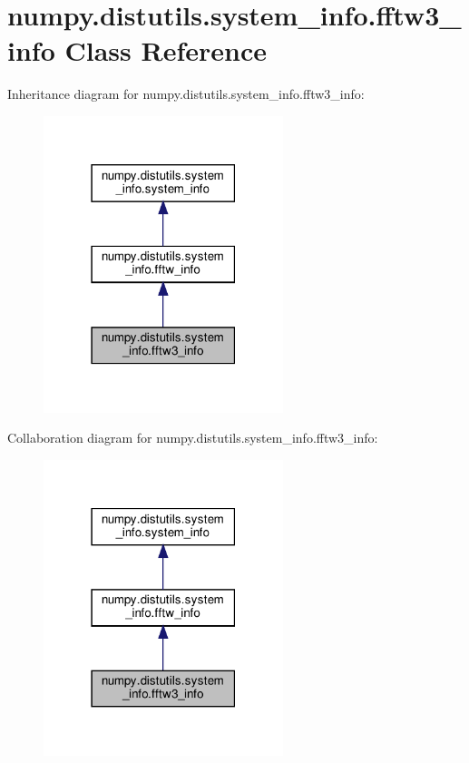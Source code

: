 \hypertarget{classnumpy_1_1distutils_1_1system__info_1_1fftw3__info}{}\section{numpy.\+distutils.\+system\+\_\+info.\+fftw3\+\_\+info Class Reference}
\label{classnumpy_1_1distutils_1_1system__info_1_1fftw3__info}


Inheritance diagram for numpy.\+distutils.\+system\+\_\+info.\+fftw3\+\_\+info\+:
\nopagebreak
\begin{figure}[H]
\begin{center}
\leavevmode
\includegraphics[width=198pt]{classnumpy_1_1distutils_1_1system__info_1_1fftw3__info__inherit__graph}
\end{center}
\end{figure}


Collaboration diagram for numpy.\+distutils.\+system\+\_\+info.\+fftw3\+\_\+info\+:
\nopagebreak
\begin{figure}[H]
\begin{center}
\leavevmode
\includegraphics[width=198pt]{classnumpy_1_1distutils_1_1system__info_1_1fftw3__info__coll__graph}
\end{center}
\end{figure}
